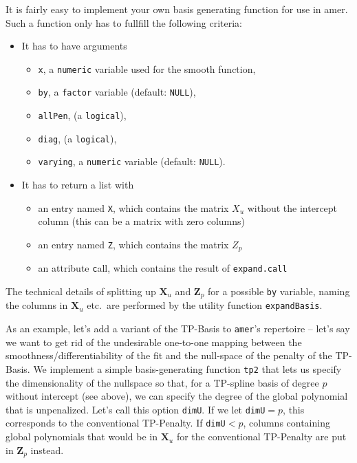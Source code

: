 \documentclass[12pt]{article}
\newcommand{\code}[1]{\texttt{\small{#1}}}
\newcommand{\package}[1]{\textsf{\small{#1}}}
\begin{document}
It is fairly easy to implement your own basis generating function for use in
\package{amer}. Such a function only has to fullfill the following criteria:
\begin{itemize}
\item It has to have arguments 
\begin{itemize}
\item \code{x}, a \code{numeric} variable used for the smooth function,
\item \code{by}, a \code{factor} variable  (default: \code{NULL}),
\item \code{allPen}, (a \code{logical}),
\item \code{diag}, (a \code{logical}),
\item \code{varying}, a \code{numeric} variable (default: \code{NULL}).
\end{itemize}
\item It has to return a list with
\begin{itemize}
\item an entry named \code X, which contains the matrix $X_u$ without the
intercept column (this can be a matrix with zero columns) 
\item an entry named \code Z, which contains the matrix $Z_p$
\item an attribute \code call, which contains the result of \code{expand.call}
\end{itemize}
\end{itemize}
The technical details of splitting up $\bm X_u$ and $\bm Z_p$ for a possible
\code{by} variable, naming the columns in $\bm X_u$ etc.~are performed by the
utility function \code{expandBasis}.

As an example, let's add a variant of the TP-Basis to \code{amer}'s repertoire --
let's say we want to get rid of the undesirable one-to-one mapping between the
smoothness/differentiability of the fit and the null-space of the penalty of the
TP-Basis. We implement a simple basis-generating function \code{tp2} that lets us
specify the dimensionality of the nullspace so that, for a TP-spline basis of
degree $p$ without intercept (see above), we can specify the degree of the global
polynomial that is unpenalized. Let's call this option \code{dimU}. If we let \code{dimU}$=p$, this
corresponds to the conventional TP-Penalty. If \code{dimU}$<p$, columns
containing global polynomials that would be in $\bm X_u$ for the conventional
TP-Penalty are put in $\bm Z_p$ instead.
 
\end{document}
